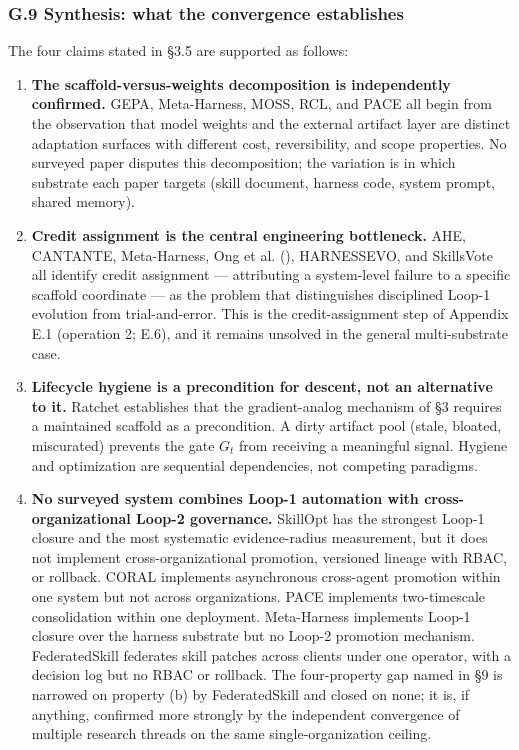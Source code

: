 \documentclass[
]{article}
\newcounter{none} %
\begin{document}
\subsubsection{G.9 Synthesis: what the convergence
establishes}\label{g.9-synthesis-what-the-convergence-establishes}

The four claims stated in §3.5 are supported as follows:

\begin{enumerate}
\def\labelenumi{\arabic{enumi}.}
\item
  \textbf{The scaffold-versus-weights decomposition is independently
  confirmed.} GEPA, Meta-Harness, MOSS, RCL, and PACE all begin from the
  observation that model weights and the external artifact layer are
  distinct adaptation surfaces with different cost, reversibility, and
  scope properties. No surveyed paper disputes this decomposition; the
  variation is in which substrate each paper targets (skill document,
  harness code, system prompt, shared memory).
\item
  \textbf{Credit assignment is the central engineering bottleneck.} AHE,
  CANTANTE, Meta-Harness, Ong et al.
  (), HARNESSEVO, and SkillsVote
  all identify credit assignment --- attributing a system-level failure
  to a specific scaffold coordinate --- as the problem that
  distinguishes disciplined Loop-1 evolution from trial-and-error. This
  is the credit-assignment step of Appendix E.1 (operation 2; E.6), and
  it remains unsolved in the general multi-substrate case.
\item
  \textbf{Lifecycle hygiene is a precondition for descent, not an
  alternative to it.} Ratchet establishes that the gradient-analog
  mechanism of §3 requires a maintained scaffold as a precondition. A
  dirty artifact pool (stale, bloated, miscurated) prevents the gate
  \(G_t\) from receiving a meaningful signal. Hygiene and optimization
  are sequential dependencies, not competing paradigms.
\item
  \textbf{No surveyed system combines Loop-1 automation with
  cross-organizational Loop-2 governance.} SkillOpt has the strongest
  Loop-1 closure and the most systematic evidence-radius measurement,
  but it does not implement cross-organizational promotion, versioned
  lineage with RBAC, or rollback. CORAL implements asynchronous
  cross-agent promotion within one system but not across organizations.
  PACE implements two-timescale consolidation within one deployment.
  Meta-Harness implements Loop-1 closure over the harness substrate but
  no Loop-2 promotion mechanism. FederatedSkill federates skill patches
  across clients under one operator, with a decision log but no RBAC or
  rollback. The four-property gap named in §9 is narrowed on property
  (b) by FederatedSkill and closed on none; it is, if anything,
  confirmed more strongly by the independent convergence of multiple
  research threads on the same single-organization ceiling.
\end{enumerate}
\end{document}
